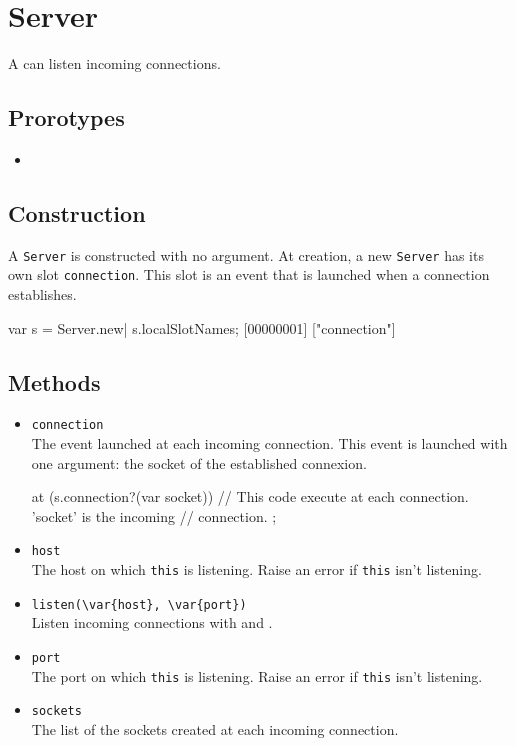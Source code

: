 \section{Server}

A  can listen incoming connections.

\subsection{Prorotypes}
\begin{itemize}
\item {}
\end{itemize}

\subsection{Construction}

A \lstinline|Server| is constructed with no argument. At creation, a
new \lstinline|Server| has its own slot \lstinline|connection|. This
slot is an event that is launched when a connection establishes.

\begin{urbiscript}
var s = Server.new|
s.localSlotNames;
[00000001] ["connection"]
\end{urbiscript}

\subsection{Methods}
\begin{itemize}
\item \lstinline|connection|\\
  The event launched at each incoming connection. This event is
  launched with one argument: the socket of the established connexion.
\begin{urbiscript}[firstnumber=last]
at (s.connection?(var socket))
{
  // This code execute at each connection. 'socket' is the incoming
  // connection.
};
\end{urbiscript}

\item \lstinline|host|\\
  The host on which \lstinline|this| is listening. Raise an error if
  \lstinline|this| isn't listening.

\item \lstinline|listen(\var{host}, \var{port})|\\
  Listen incoming connections with  and .

\item \lstinline|port|\\
  The port on which \lstinline|this| is listening. Raise an error if
  \lstinline|this| isn't listening.

\item \lstinline|sockets|\\
  The list of the sockets created at each incoming connection.

\end{itemize}
